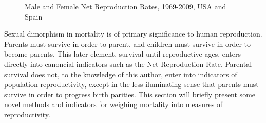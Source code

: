 \begin{figure}[ht!]
        \centering  
          \caption{Male and Female Net Reproduction Rates, 1969-2009, USA and
          Spain}
          \label{fig:NRRseries}
\end{figure}




Sexual dimorphism in mortality is of primary significance to human reproduction.
Parents must survive in order to parent, and children must survive in order to
become parents. This later element, survival until reproductive ages, enters
directly into canoncial indicators such as the Net Reproduction Rate. Parental
survival does not, to the knowledge of this author, enter into indicators of
population reproductivity, except in the less-iluminating sense that parents
must survive in order to progress birth parities. This section will briefly present 
some novel methods and indicators for weighing mortality into measures of
reproductivity.